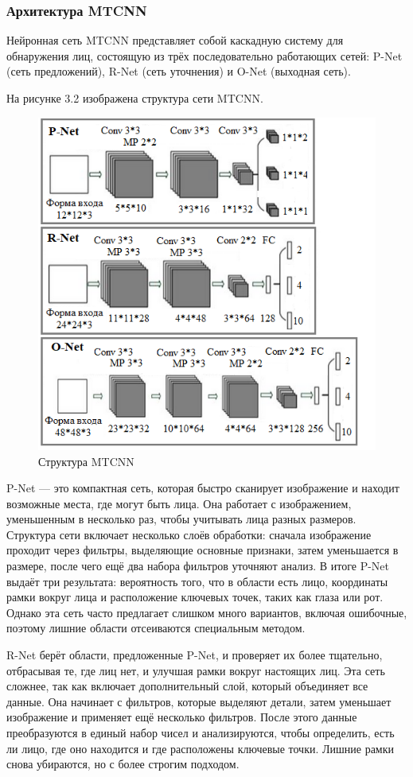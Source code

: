 \subsubsection{Архитектура MTCNN}

Нейронная сеть MTCNN представляет собой каскадную систему для обнаружения лиц, состоящую из трёх последовательно работающих сетей: P-Net (сеть предложений), R-Net (сеть уточнения) и O-Net (выходная сеть). 

На рисунке 3.2 изображена структура сети MTCNN.

\begin{figure}[H]
	\centering
	\includegraphics[width=0.7\linewidth]{images/mtcnn}
	\caption{Структура MTCNN}
	\label{fig:mtcnn}
\end{figure}

P-Net — это компактная сеть, которая быстро сканирует изображение и находит возможные места, где могут быть лица. Она работает с изображением, уменьшенным в несколько раз, чтобы учитывать лица разных размеров. Структура сети включает несколько слоёв обработки: сначала изображение проходит через фильтры, выделяющие основные признаки, затем уменьшается в размере, после чего ещё два набора фильтров уточняют анализ. В итоге P-Net выдаёт три результата: вероятность того, что в области есть лицо, координаты рамки вокруг лица и расположение ключевых точек, таких как глаза или рот. Однако эта сеть часто предлагает слишком много вариантов, включая ошибочные, поэтому лишние области отсеиваются специальным методом.

R-Net берёт области, предложенные P-Net, и проверяет их более тщательно, отбрасывая те, где лиц нет, и улучшая рамки вокруг настоящих лиц. Эта сеть сложнее, так как включает дополнительный слой, который объединяет все данные. Она начинает с фильтров, которые выделяют детали, затем уменьшает изображение и применяет ещё несколько фильтров. После этого данные преобразуются в единый набор чисел и анализируются, чтобы определить, есть ли лицо, где оно находится и где расположены ключевые точки. Лишние рамки снова убираются, но с более строгим подходом.

